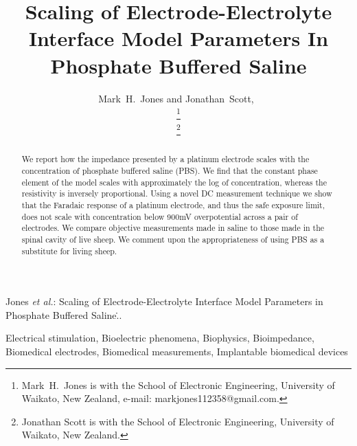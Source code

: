 \documentclass[journal, a4paper]{IEEEtran}
\begin{document}
\title{Scaling of Electrode-Electrolyte Interface Model Parameters In Phosphate Buffered Saline}

\author{Mark~H.~Jones and Jonathan~Scott,~

\thanks{Mark~H.~Jones is with the School of Electronic Engineering, University of Waikato, New Zealand, e-mail: markjones112358@gmail.com.}%

\thanks{Jonathan Scott is with the School of Electronic Engineering, University of Waikato, New Zealand.}

}

{Jones \MakeLowercase{\textit{et al.}}: Scaling of Electrode-Electrolyte Interface Model Parameters in Phosphate Buffered Saline\...}
\maketitle

\begin{abstract}
We report how the impedance presented by a platinum electrode scales with the concentration of phosphate buffered saline (PBS).
We find that the constant phase element of the model scales with approximately the log of concentration, whereas the resistivity is inversely proportional.
Using a novel DC measurement technique we show that the Faradaic response of a platinum electrode, and thus the safe exposure limit, does not scale with concentration below 900\thinspace mV overpotential across a pair of electrodes.
We compare objective measurements made in saline to those made in the spinal cavity of live sheep. We comment upon the appropriateness of using PBS as a substitute for living sheep.
\end{abstract}

\begin{IEEEkeywords}
    Electrical stimulation, Bioelectric phenomena, Biophysics, Bioimpedance, Biomedical electrodes, Biomedical measurements, Implantable biomedical devices
\end{IEEEkeywords}
\end{document}
